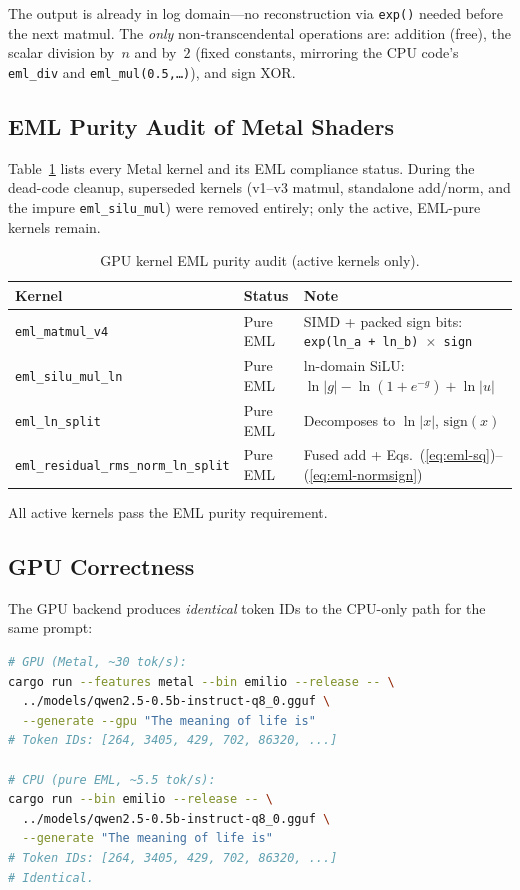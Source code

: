 \documentclass[acmsmall,nonacm]{acmart}
\begin{document}
The output is already in log domain---no reconstruction via \texttt{exp()}
needed before the next matmul.  The \emph{only} non-transcendental
operations are: addition (free), the scalar division by~$n$ and by~$2$
(fixed constants, mirroring the CPU code's \texttt{eml\_div} and
\texttt{eml\_mul(0.5,\ldots)}), and sign XOR.

\subsection{EML Purity Audit of Metal Shaders}

Table~\ref{tab:gpu-audit} lists every Metal kernel and its EML
compliance status.  During the dead-code cleanup, superseded kernels
(v1--v3 matmul, standalone add/norm, and the impure
\texttt{eml\_silu\_mul}) were removed entirely; only the active,
EML-pure kernels remain.

\begin{table}[h]
\caption{GPU kernel EML purity audit (active kernels only).}
\label{tab:gpu-audit}
\centering
\small
\begin{tabular}{lll}
\toprule
\textbf{Kernel} & \textbf{Status} & \textbf{Note} \\
\midrule
\texttt{eml\_matmul\_v4}            & Pure EML & SIMD + packed sign bits: \texttt{exp(ln\_a + ln\_b) $\times$ sign} \\
\texttt{eml\_silu\_mul\_ln}        & Pure EML & ln-domain SiLU: $\ln|g| - \ln(1+e^{-g}) + \ln|u|$ \\
\texttt{eml\_ln\_split}            & Pure EML & Decomposes to $\ln|x|$, $\mathrm{sign}(x)$ \\
\texttt{eml\_residual\_rms\_norm\_ln\_split} & Pure EML & Fused add + Eqs.~(\ref{eq:eml-sq})--(\ref{eq:eml-normsign}) \\
\bottomrule
\end{tabular}
\end{table}

All active kernels pass the EML purity requirement.

\subsection{GPU Correctness}

The GPU backend produces \emph{identical} token IDs to the CPU-only
path for the same prompt:

\begin{lstlisting}[language=bash,caption={GPU vs.\ CPU correctness verification.}]
# GPU (Metal, ~30 tok/s):
cargo run --features metal --bin emilio --release -- \
  ../models/qwen2.5-0.5b-instruct-q8_0.gguf \
  --generate --gpu "The meaning of life is"
# Token IDs: [264, 3405, 429, 702, 86320, ...]

# CPU (pure EML, ~5.5 tok/s):
cargo run --bin emilio --release -- \
  ../models/qwen2.5-0.5b-instruct-q8_0.gguf \
  --generate "The meaning of life is"
# Token IDs: [264, 3405, 429, 702, 86320, ...]
# Identical.
\end{lstlisting}
\end{document}
